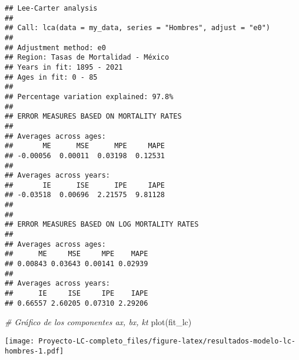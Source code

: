 \documentclass[
]{article}
\newenvironment{Shaded}{\begin{snugshade}}{\end{snugshade}}
\newcommand{\CommentTok}[1]{\textcolor[rgb]{0.56,0.35,0.01}{\textit{#1}}}
\newcommand{\FunctionTok}[1]{\textcolor[rgb]{0.00,0.00,0.00}{#1}}
\newcommand{\NormalTok}[1]{#1}
\begin{document}
\begin{verbatim}
## Lee-Carter analysis
## 
## Call: lca(data = my_data, series = "Hombres", adjust = "e0") 
## 
## Adjustment method: e0
## Region: Tasas de Mortalidad - México
## Years in fit: 1895 - 2021
## Ages in fit: 0 - 85 
## 
## Percentage variation explained: 97.8%
## 
## ERROR MEASURES BASED ON MORTALITY RATES
## 
## Averages across ages:
##       ME      MSE      MPE     MAPE 
## -0.00056  0.00011  0.03198  0.12531 
## 
## Averages across years:
##       IE      ISE      IPE     IAPE 
## -0.03518  0.00696  2.21575  9.81128 
## 
## 
## ERROR MEASURES BASED ON LOG MORTALITY RATES
## 
## Averages across ages:
##      ME     MSE     MPE    MAPE 
## 0.00843 0.03643 0.00141 0.02939 
## 
## Averages across years:
##      IE     ISE     IPE    IAPE 
## 0.66557 2.60205 0.07310 2.29206
\end{verbatim}

\begin{Shaded}
\begin{Highlighting}[]
\CommentTok{\# Gráfico de los componentes ax, bx, kt}
\FunctionTok{plot}\NormalTok{(fit\_lc)}
\end{Highlighting}
\end{Shaded}

\texttt{[image: Proyecto-LC-completo\_files/figure-latex/resultados-modelo-lc-hombres-1.pdf]}
\end{document}
